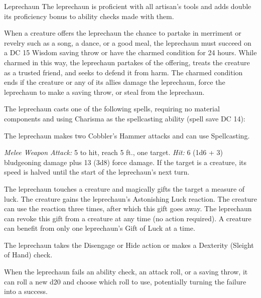 \documentclass[10pt,a4paper,twoside,bg=print,twocolumn,openany,nodeprecatedcode]{dndbook}
\begin{document}
\begin{DndMonster}[float=t]{Leprechaun}
\DndMonsterBasics[
armor-class = {13},
hit-points = {\DndDice{8d6 + 24}},
speed = {30 ft.}
]
\DndMonsterAbilityScores[
 str = 6,
 dex = 17,
 con = 16,
 int = 12,
 wis = 14,
 cha = 18
]
\DndMonsterDetails[
saving-throws = {Con +5, Wis +4},
skills = {Perception +4, Sleight Of Hand +7, Stealth +5},
senses = {darkvision 60 ft., passive perception 14},
languages = {Common, Sylvan},
challenge = 4,
]
The leprechaun is proficient with all artisan's tools and adds double its proficiency bonus to ability checks made with them.

When a creature offers the leprechaun the chance to partake in merriment or revelry such as a song, a dance, or a good meal, the leprechaun must succeed on a DC 15 Wisdom saving throw or have the charmed condition for 24 hours. While charmed in this way, the leprechaun partakes of the offering, treats the creature as a trusted friend, and seeks to defend it from harm. The charmed condition ends if the creature or any of its allies damage the leprechaun, force the leprechaun to make a saving throw, or steal from the leprechaun.

The leprechaun casts one of the following spells, requiring no material components and using Charisma as the spellcasting ability (spell save DC 14):
\begin{DndMonsterSpells}
\end{DndMonsterSpells}
The leprechaun makes two Cobbler's Hammer attacks and can use Spellcasting.

\textsl{Melee Weapon Attack:} 5 to hit, reach 5 ft., one target. \textsl{Hit:} 6 (1d6 + 3) bludgeoning damage plus 13 (3d8) force damage. If the target is a creature, its speed is halved until the start of the leprechaun's next turn.

The leprechaun touches a creature and magically gifts the target a measure of luck. The creature gains the leprechaun's Astonishing Luck reaction. The creature can use the reaction three times, after which this gift goes away. The leprechaun can revoke this gift from a creature at any time (no action required). A creature can benefit from only one leprechaun's Gift of Luck at a time.

The leprechaun takes the Disengage or Hide action or makes a Dexterity (Sleight of Hand) check.

When the leprechaun fails an ability check, an attack roll, or a saving throw, it can roll a new d20 and choose which roll to use, potentially turning the failure into a success.

\end{DndMonster}
\end{document}
